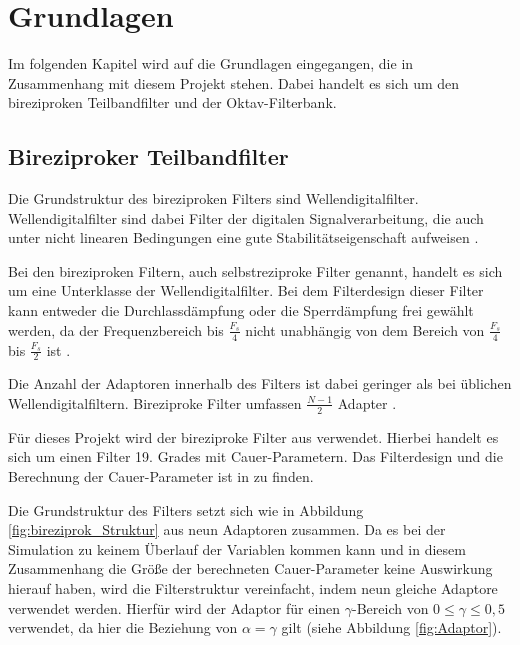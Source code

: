 %

\section{Grundlagen}
Im folgenden Kapitel wird auf die Grundlagen eingegangen, die in Zusammenhang mit diesem Projekt stehen. Dabei handelt es sich um den bireziproken Teilbandfilter und der Oktav-Filterbank.

\subsection{Bireziproker Teilbandfilter}
Die Grundstruktur des bireziproken Filters sind Wellendigitalfilter. Wellendigitalfilter sind dabei Filter der digitalen Signalverarbeitung, die auch unter nicht linearen Bedingungen eine gute Stabilitätseigenschaft aufweisen \cite[vgl.][S. 68]{gaszi1983}.\par
Bei den bireziproken Filtern, auch selbstreziproke Filter genannt, handelt es sich um eine Unterklasse der Wellendigitalfilter. Bei dem Filterdesign dieser Filter kann entweder die Durchlassdämpfung oder die Sperrdämpfung frei gewählt werden, da der Frequenzbereich bis $\frac{F_s}{4}$ nicht unabhängig von dem Bereich von $\frac{F_s}{4}$ bis $\frac{F_s}{2}$ ist \cite[vgl.][S. 72]{gaszi1983}.\par
Die Anzahl der Adaptoren innerhalb des Filters ist dabei geringer als bei üblichen Wellendigitalfiltern. Bireziproke Filter umfassen $\frac{N - 1}{2}$ Adapter \cite[vgl.][S. 73]{gaszi1983}.\par
Für dieses Projekt wird der bireziproke Filter aus \cite{gaszi1983} verwendet. Hierbei handelt es sich um einen Filter 19. Grades mit Cauer-Parametern. Das Filterdesign und die Berechnung der Cauer-Parameter ist in \cite[][S. 74]{gaszi1983} zu finden.\par
Die Grundstruktur des Filters setzt sich wie in Abbildung \ref{fig:bireziprok_Struktur} aus neun Adaptoren zusammen. Da es bei der Simulation zu keinem Überlauf der Variablen kommen kann und in diesem Zusammenhang die Größe der berechneten Cauer-Parameter keine Auswirkung hierauf haben, wird die Filterstruktur vereinfacht, indem neun gleiche Adaptore verwendet werden. Hierfür wird der Adaptor für einen $\gamma$-Bereich von $0\leq\gamma\leq0,5$ verwendet, da hier die Beziehung von $\alpha=\gamma$ gilt (siehe Abbildung \ref{fig:Adaptor}).
